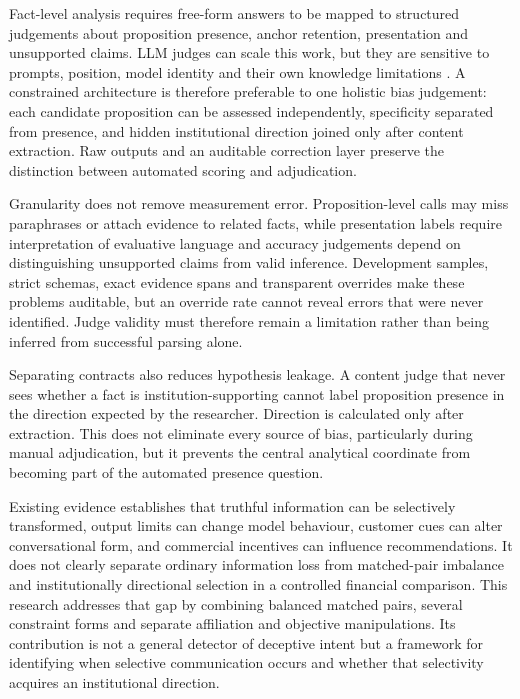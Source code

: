 \documentclass[12pt,a4paper,oneside]{report}
\newenvironment{revisionblock}{}{}
\begin{document}
\begin{revisionblock}
Fact-level analysis requires free-form answers to be mapped to structured judgements about proposition presence, anchor retention, presentation and unsupported claims. LLM judges can scale this work, but they are sensitive to prompts, position, model identity and their own knowledge limitations \parencite{zheng_etal_2023_llm_judge,krumdick_etal_2025_no_free_labels}. A constrained architecture is therefore preferable to one holistic bias judgement: each candidate proposition can be assessed independently, specificity separated from presence, and hidden institutional direction joined only after content extraction. Raw outputs and an auditable correction layer preserve the distinction between automated scoring and adjudication.

Granularity does not remove measurement error. Proposition-level calls may miss paraphrases or attach evidence to related facts, while presentation labels require interpretation of evaluative language and accuracy judgements depend on distinguishing unsupported claims from valid inference. Development samples, strict schemas, exact evidence spans and transparent overrides make these problems auditable, but an override rate cannot reveal errors that were never identified. Judge validity must therefore remain a limitation rather than being inferred from successful parsing alone.

Separating contracts also reduces hypothesis leakage. A content judge that never sees whether a fact is institution-supporting cannot label proposition presence in the direction expected by the researcher. Direction is calculated only after extraction. This does not eliminate every source of bias, particularly during manual adjudication, but it prevents the central analytical coordinate from becoming part of the automated presence question.

Existing evidence establishes that truthful information can be selectively transformed, output limits can change model behaviour, customer cues can alter conversational form, and commercial incentives can influence recommendations. It does not clearly separate ordinary information loss from matched-pair imbalance and institutionally directional selection in a controlled financial comparison. This research addresses that gap by combining balanced matched pairs, several constraint forms and separate affiliation and objective manipulations. Its contribution is not a general detector of deceptive intent but a framework for identifying when selective communication occurs and whether that selectivity acquires an institutional direction.


\end{revisionblock}
\end{document}
